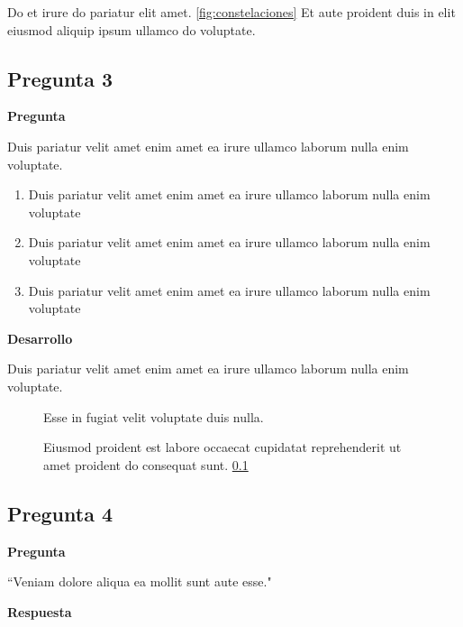 Do et irure do pariatur elit amet. \ref{fig:constelaciones} Et aute proident duis in elit eiusmod aliquip ipsum ullamco do voluptate.


\subsection{Pregunta 3} \label{subsec:pregunta3}

\noindent \textbf{Pregunta} 


Duis pariatur velit amet enim amet ea irure ullamco laborum nulla enim voluptate.

\begin{enumerate}
    \item[a)] Duis pariatur velit amet enim amet ea irure ullamco laborum nulla enim voluptate
    \item[b)] Duis pariatur velit amet enim amet ea irure ullamco laborum nulla enim voluptate
    \item[c)] Duis pariatur velit amet enim amet ea irure ullamco laborum nulla enim voluptate
\end{enumerate}

\noindent \textbf{Desarrollo} 

Duis pariatur velit amet enim amet ea irure ullamco laborum nulla enim voluptate.


\begin{figure}[ht!]
    \centering
    \caption{Eiusmod proident est labore occaecat cupidatat reprehenderit ut amet proident do consequat sunt. \ref{subsec:pregunta3}}
    {Esse in fugiat velit voluptate duis nulla.}
    \label{fig:pregunta3desarrollo}
\end{figure}


\subsection{Pregunta 4} \label{subsec:pregunta4}
\noindent \textbf{Pregunta} 

``Veniam dolore aliqua ea mollit sunt aute esse."

\noindent \textbf{Respuesta}

